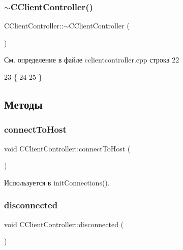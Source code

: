 \subsubsection{\texorpdfstring{$\sim$\+C\+Client\+Controller()}{~CClientController()}}
{\footnotesize\ttfamily C\+Client\+Controller\+::$\sim$\+C\+Client\+Controller (\begin{DoxyParamCaption}{ }\end{DoxyParamCaption})\hspace{0.3cm}{\ttfamily [virtual]}}



См. определение в файле cclientcontroller.\+cpp строка 22


\begin{DoxyCode}
23 \{
24 
25 \}
\end{DoxyCode}


\subsection{Методы}
\hypertarget{class_c_client_controller_a358ef743560d560acef69e90dfaca11e}{}\label{class_c_client_controller_a358ef743560d560acef69e90dfaca11e} 
\subsubsection{\texorpdfstring{connect\+To\+Host}{connectToHost}}
{\footnotesize\ttfamily void C\+Client\+Controller\+::connect\+To\+Host (\begin{DoxyParamCaption}{ }\end{DoxyParamCaption})\hspace{0.3cm}{\ttfamily [signal]}}



Используется в init\+Connections().

\hypertarget{class_c_client_controller_a171db18126ffb9541f47aec5cc0eda79}{}\label{class_c_client_controller_a171db18126ffb9541f47aec5cc0eda79} 
\subsubsection{\texorpdfstring{disconnected}{disconnected}}
{\footnotesize\ttfamily void C\+Client\+Controller\+::disconnected (\begin{DoxyParamCaption}{ }\end{DoxyParamCaption})\hspace{0.3cm}{\ttfamily [signal]}}



